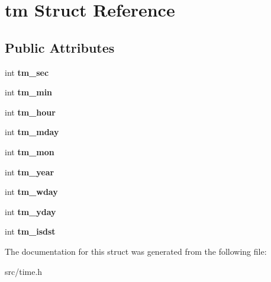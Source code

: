 \hypertarget{structtm}{}\section{tm Struct Reference}
\label{structtm}
\subsection*{Public Attributes}
\begin{DoxyCompactItemize}
\item 
\hypertarget{structtm_a4d098a9a5c03a00b2ee61e10851de81e}{}int {\bfseries tm\+\_\+sec}\label{structtm_a4d098a9a5c03a00b2ee61e10851de81e}

\item 
\hypertarget{structtm_af414eb7c86cc3099595211eee4d4211b}{}int {\bfseries tm\+\_\+min}\label{structtm_af414eb7c86cc3099595211eee4d4211b}

\item 
\hypertarget{structtm_a3e7ca4e37f1abcaf56b8a916c38eb9fe}{}int {\bfseries tm\+\_\+hour}\label{structtm_a3e7ca4e37f1abcaf56b8a916c38eb9fe}

\item 
\hypertarget{structtm_ab8d8904bad43b0c8b96e61941c5b5310}{}int {\bfseries tm\+\_\+mday}\label{structtm_ab8d8904bad43b0c8b96e61941c5b5310}

\item 
\hypertarget{structtm_a112ac36fa2f593777138a417cf031e17}{}int {\bfseries tm\+\_\+mon}\label{structtm_a112ac36fa2f593777138a417cf031e17}

\item 
\hypertarget{structtm_a33adf78fd6476b2120ce3b9c4a852053}{}int {\bfseries tm\+\_\+year}\label{structtm_a33adf78fd6476b2120ce3b9c4a852053}

\item 
\hypertarget{structtm_afe81a8c46f1c693c43f259b288859f4f}{}int {\bfseries tm\+\_\+wday}\label{structtm_afe81a8c46f1c693c43f259b288859f4f}

\item 
\hypertarget{structtm_a93a0ba77cc23796df84405dcbcc57eb1}{}int {\bfseries tm\+\_\+yday}\label{structtm_a93a0ba77cc23796df84405dcbcc57eb1}

\item 
\hypertarget{structtm_a5645ca0580c8ab2c24f6c2965d9c9f9c}{}int {\bfseries tm\+\_\+isdst}\label{structtm_a5645ca0580c8ab2c24f6c2965d9c9f9c}

\end{DoxyCompactItemize}


The documentation for this struct was generated from the following file\+:\begin{DoxyCompactItemize}
\item 
src/time.\+h\end{DoxyCompactItemize}
